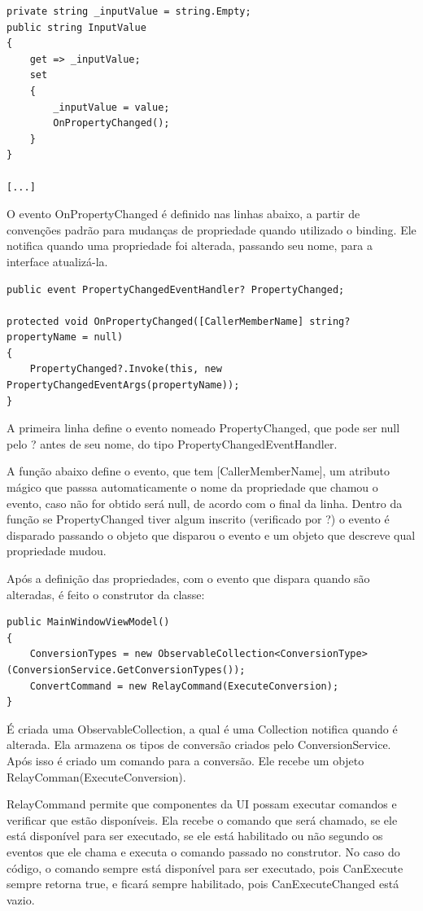 \documentclass[
	12pt,				%
	oneside,			%
	a4paper,			%
	english,			%
	brazil,				%
	]{abntex2}
\begin{document}
{\begin{verbatim}
private string _inputValue = string.Empty;
public string InputValue
{
    get => _inputValue;
    set
    {
        _inputValue = value;
        OnPropertyChanged();
    }
}

[...]
\end{verbatim}

O evento OnPropertyChanged é definido nas linhas abaixo, a partir de convenções padrão para mudanças de propriedade quando utilizado o binding. Ele notifica quando uma propriedade foi alterada, passando seu nome, para a interface atualizá-la.

\begin{verbatim}
public event PropertyChangedEventHandler? PropertyChanged;

protected void OnPropertyChanged([CallerMemberName] string? propertyName = null)
{
    PropertyChanged?.Invoke(this, new PropertyChangedEventArgs(propertyName));
}
\end{verbatim}

A primeira linha define o evento nomeado PropertyChanged, que pode ser null pelo ? antes de seu nome, do tipo PropertyChangedEventHandler.

A função abaixo define o evento, que tem [CallerMemberName], um atributo mágico que passsa automaticamente o nome da propriedade que chamou o evento, caso não for obtido será null, de acordo com o final da linha. Dentro da função se PropertyChanged tiver algum inscrito (verificado por ?) o evento é disparado passando o objeto que disparou o evento e um objeto que descreve qual propriedade mudou.

Após a definição das propriedades, com o evento que dispara quando são alteradas, é feito o construtor da classe:

\begin{verbatim}
public MainWindowViewModel()
{
    ConversionTypes = new ObservableCollection<ConversionType>(ConversionService.GetConversionTypes());
    ConvertCommand = new RelayCommand(ExecuteConversion);
}
\end{verbatim}

É  criada uma ObservableCollection, a qual é uma Collection notifica quando é alterada. Ela armazena os tipos de conversão criados pelo ConversionService. Após isso é criado um comando para a conversão. Ele recebe um objeto RelayComman(ExecuteConversion).

RelayCommand permite que componentes da UI possam executar comandos e verificar que estão disponíveis. Ela recebe o comando que será chamado, se ele está disponível para ser executado, se ele está habilitado ou não segundo os eventos que ele chama e executa o comando passado no construtor. No caso do código, o comando sempre está disponível para ser executado, pois CanExecute sempre retorna true, e ficará sempre habilitado, pois CanExecuteChanged está vazio.

}
\end{document}
